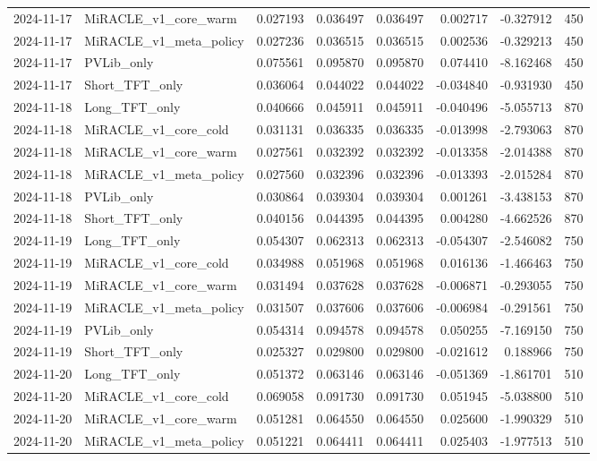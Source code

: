 \begin{tabular}{llrrrrrr}
2024-11-17 & MiRACLE_v1_core_warm & 0.027193 & 0.036497 & 0.036497 & 0.002717 & -0.327912 & 450 \\
2024-11-17 & MiRACLE_v1_meta_policy & 0.027236 & 0.036515 & 0.036515 & 0.002536 & -0.329213 & 450 \\
2024-11-17 & PVLib_only & 0.075561 & 0.095870 & 0.095870 & 0.074410 & -8.162468 & 450 \\
2024-11-17 & Short_TFT_only & 0.036064 & 0.044022 & 0.044022 & -0.034840 & -0.931930 & 450 \\
2024-11-18 & Long_TFT_only & 0.040666 & 0.045911 & 0.045911 & -0.040496 & -5.055713 & 870 \\
2024-11-18 & MiRACLE_v1_core_cold & 0.031131 & 0.036335 & 0.036335 & -0.013998 & -2.793063 & 870 \\
2024-11-18 & MiRACLE_v1_core_warm & 0.027561 & 0.032392 & 0.032392 & -0.013358 & -2.014388 & 870 \\
2024-11-18 & MiRACLE_v1_meta_policy & 0.027560 & 0.032396 & 0.032396 & -0.013393 & -2.015284 & 870 \\
2024-11-18 & PVLib_only & 0.030864 & 0.039304 & 0.039304 & 0.001261 & -3.438153 & 870 \\
2024-11-18 & Short_TFT_only & 0.040156 & 0.044395 & 0.044395 & 0.004280 & -4.662526 & 870 \\
2024-11-19 & Long_TFT_only & 0.054307 & 0.062313 & 0.062313 & -0.054307 & -2.546082 & 750 \\
2024-11-19 & MiRACLE_v1_core_cold & 0.034988 & 0.051968 & 0.051968 & 0.016136 & -1.466463 & 750 \\
2024-11-19 & MiRACLE_v1_core_warm & 0.031494 & 0.037628 & 0.037628 & -0.006871 & -0.293055 & 750 \\
2024-11-19 & MiRACLE_v1_meta_policy & 0.031507 & 0.037606 & 0.037606 & -0.006984 & -0.291561 & 750 \\
2024-11-19 & PVLib_only & 0.054314 & 0.094578 & 0.094578 & 0.050255 & -7.169150 & 750 \\
2024-11-19 & Short_TFT_only & 0.025327 & 0.029800 & 0.029800 & -0.021612 & 0.188966 & 750 \\
2024-11-20 & Long_TFT_only & 0.051372 & 0.063146 & 0.063146 & -0.051369 & -1.861701 & 510 \\
2024-11-20 & MiRACLE_v1_core_cold & 0.069058 & 0.091730 & 0.091730 & 0.051945 & -5.038800 & 510 \\
2024-11-20 & MiRACLE_v1_core_warm & 0.051281 & 0.064550 & 0.064550 & 0.025600 & -1.990329 & 510 \\
2024-11-20 & MiRACLE_v1_meta_policy & 0.051221 & 0.064411 & 0.064411 & 0.025403 & -1.977513 & 510 \\

\end{tabular}
